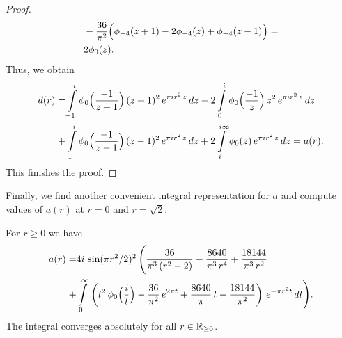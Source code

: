 \begin{proof}
\begin{align}
  &-\frac{36}{\pi^2}\Big(\phi_{-4}(z+1)-2\phi_{-4}(z)+\phi_{-4}(z-1)\Big)=\notag\\
  &2\phi_0(z).
   \end{align}
   Thus, we obtain
   \begin{align}
   d(r)=&\int\limits_{-1}^{i}\phi_0\Big(\frac{-1}{z+1}\Big)\,(z+1)^2\,e^{\pi i r^2 \,z}\,dz
   -2\int\limits_{0}^{i}\phi_0\Big(\frac{-1}{z}\Big)\,z^2\,e^{\pi i r^2 \,z}\,dz\notag\\
   +&\int\limits_{1}^{i}\phi_0\Big(\frac{-1}{z-1}\Big)\,(z-1)^2\,e^{\pi i r^2 \,z}\,dz
   +2\int\limits_{i}^{i\infty}\phi_0(z)\,e^{\pi i r^2 \,z}\,dz=a(r).\notag
  \end{align}
  This finishes the proof.
  \end{proof}
  Finally, we find another convenient integral representation for $a$ and compute values of $a(r)$ at $r=0$ and $r=\sqrt{2}$.
  \begin{proposition}\label{prop: a another integral}
  For $r\geq0$ we have
  \begin{align}\label{eqn: a another integral}a(r)=&4i\,\sin(\pi r^2/2)^2\,\Bigg(\frac{36}{\pi^3\,(r^2-2)}-\frac{8640}{\pi^3\,r^4}+\frac{18144}{\pi^3\,r^2}\\ +&\int\limits_0^\infty\,\left(t^2\,\phi_0\Big(\frac{i}{t}\Big)-\frac{36}{\pi^2}\,e^{2\pi t}+\frac{8640}{\pi}\,t-\frac{18144}{\pi^2}\right)\,e^{-\pi r^2 t}\,dt \Bigg) .\notag\end{align}
  The integral converges absolutely for all $r\in\mathbb{R}_{\geq 0}$.
  \end{proposition}
